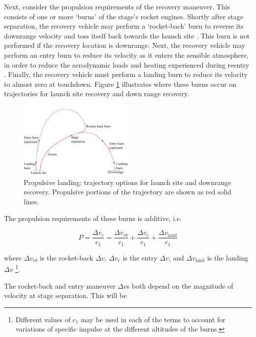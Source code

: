 \documentclass[conf]{new-aiaa}
\begin{document}
Next, consider the propulsion requirements of the recovery maneuver. This consists of one or more `burns' of the stage's rocket engines. Shortly after stage separation, the recovery vehicle may perform a `rocket-back' burn to reverse its downrange velocity and toss itself back towards the launch site \cite{McKinney1986, NAP13534}. This burn is not performed if the recovery location is downrange. Next, the recovery vehicle may perform an entry burn to reduce its velocity as it enters the sensible atmosphere, in order to reduce the aerodynamic loads and heating experienced during reentry \cite{Stappert2017}. Finally, the recovery vehicle must perform a landing burn to reduce its velocity to almost zero at touchdown. Figure \ref{fig:propulsive_landing} illustrates where these burns occur on trajectories for launch site recovery and down range recovery.

\begin{figure}[hbt!]
	\centering
	\includegraphics[width=0.5\textwidth]{figures/propulsive_landing}
	\caption{\label{fig:propulsive_landing} Propulsive landing: trajectory options for launch site and downrange recovery. Propulsive portions of the trajectory are shown as red solid lines.}
\end{figure}

The propulsion requirements of these burns is additive, i.e.

\begin{equation}
P = \frac{\Delta v_r}{c_1} = \frac{\Delta v_{rb}}{c_1} + \frac{\Delta v_{e}}{c_1} + \frac{\Delta v_{\mathrm{land}}}{c_1}
\end{equation}

where $\Delta v_{rb}$ is the rocket-back $\Delta v$, $\Delta v_{e}$ is the entry $\Delta v$, and $\Delta v_{\mathrm{land}}$ is the landing $\Delta v$ \footnote{Different values of $c_1$ may be used in each of the terms to account for variations of specific impulse at the different altitudes of the burns.}.



The rocket-back and entry maneuver $\Delta v$s both depend on the magnitude of velocity at stage separation. This will be
\end{document}
